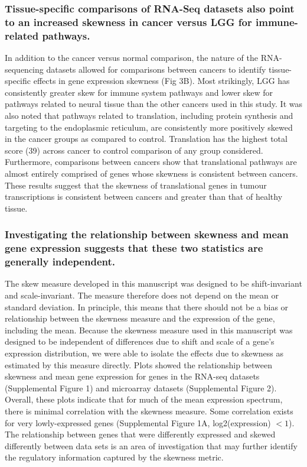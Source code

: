 \documentclass[11pt]{article}
\begin{document}
\subsubsection*{Tissue-specific comparisons of RNA-Seq datasets also point to an increased skewness in cancer versus LGG for immune-related pathways.}

In addition to the cancer versus normal comparison, the nature of the RNA-sequencing datasets allowed for comparisons between cancers to identify tissue-specific effects in gene expression skewness (Fig 3B). Most strikingly, LGG has consistently greater skew for immune system pathways and lower skew for pathways related to neural tissue than the other cancers used in this study. It was also noted that pathways related to translation, including protein synthesis and targeting to the endoplasmic reticulum, are consistently more positively skewed in the cancer groups as compared to control. Translation has the highest total score (39) across cancer to control comparison of any group considered. Furthermore, comparisons between cancers show that translational pathways are almost entirely comprised of genes whose skewness is consistent between cancers. These results suggest that the skewness of translational genes in tumour transcriptions is consistent between cancers and greater than that of healthy tissue. 

{\color{red} \subsubsection*{Investigating the relationship between skewness and mean gene expression suggests that these two statistics are generally independent. }

The skew measure developed in this manuscript was designed to be shift-invariant and scale-invariant. The measure therefore does not depend on the mean or standard deviation. In principle, this means that there should not be a bias or relationship between the skewness measure and the expression of the gene, including the mean. Because the skewness measure used in this manuscript was designed to be independent of differences due to shift and scale of a gene’s expression distribution, we were able to isolate the effects due to skewness as estimated by this measure directly. Plots showed the relationship between skewness and mean gene expression for genes in the RNA-seq datasets (Supplemental Figure 1) and microarray datasets (Supplemental Figure 2). Overall, these plots indicate that for much of the mean expression spectrum, there is minimal correlation with the skewness measure. Some correlation exists for very lowly-expressed genes (Supplemental Figure 1A, log2(expression) $< 1$). The relationship between genes that were differently expressed and skewed differently between data sets is an area of investigation that may further identify the regulatory information captured by the skewness metric. }
\end{document}
